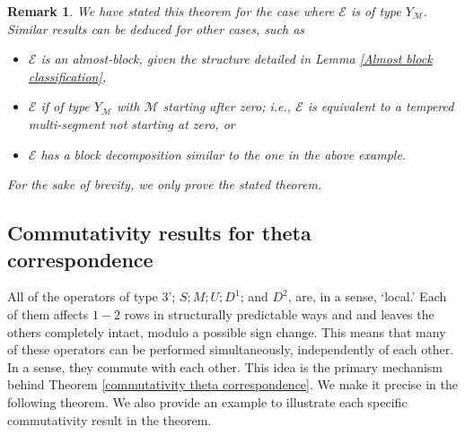 \documentclass[11pt,letterpaper]{amsart}
\newtheorem{rmk}[thm]{Remark}
\numberwithin{equation}{section}
\begin{document}
\begin{rmk}
    We have stated this theorem for the case where $\mathcal{E}$ is of type $Y_\mathcal{M}.$ Similar results can be deduced for other cases, such as

    \begin{itemize}
        \item $\mathcal{E}$ is an almost-block, given the structure detailed in Lemma \ref{Almost block classification},
        \item $\mathcal{E}$ if of type $Y_\mathcal{M}$ with $\mathcal{M}$ starting after zero; i.e., $\mathcal{E}$ is equivalent to a tempered multi-segment not starting at zero, or
        \item $\mathcal{E}$ has a block decomposition similar to the one in the above example.
    \end{itemize}

    For the sake of brevity, we only prove the stated theorem.
\end{rmk}

\subsection{Commutativity results for theta correspondence}

All of the operators of type 3'; $S; M; U; D^1$; and $D^2$, are, in a sense, `local.' Each of them affects $1-2$ rows in structurally predictable ways and and leaves the others completely intact, modulo a possible sign change. This means that many of these operators can be performed simultaneously, independently of each other. In a sense, they commute with each other. This idea is the primary mechanism behind Theorem \ref{commutativity theta correspondence}. We make it precise in the following theorem. We also provide an example to illustrate each specific commutativity result in the theorem.
\end{document}
